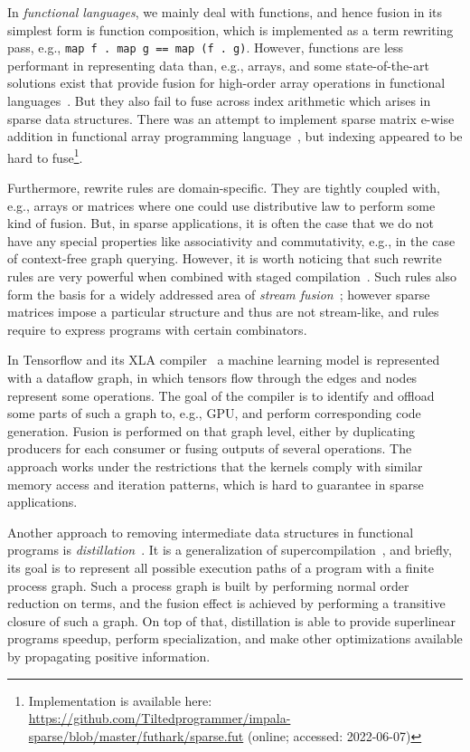 In \textit{functional languages}, we mainly deal with functions, and hence fusion in its simplest form is function composition, which is implemented as a term rewriting pass, e.g., \texttt{map f . map g == map (f . g)}. However, functions are less performant in representing data than, e.g., arrays, and some state-of-the-art solutions exist that provide fusion for high-order array operations in functional languages~\cite{Futhark}. But they also fail to fuse across index arithmetic which arises in sparse data structures. There was an attempt to implement sparse matrix e-wise addition in functional array programming language~\cite{Futhark}, but indexing appeared to be hard to fuse\footnote{Implementation is available here: \url{https://github.com/Tiltedprogrammer/impala-sparse/blob/master/futhark/sparse.fut} (online; accessed: 2022-06-07)}. 

Furthermore, rewrite rules are domain-specific. They are tightly coupled with, e.g., arrays or matrices where one could use distributive law to perform some kind of fusion. But, in sparse applications, it is often the case that we do not have any special properties like associativity and commutativity, e.g., in the case of context-free graph querying. However, it is worth noticing that such rewrite rules are very powerful when combined with staged compilation~\cite{stagedLinAlg}. Such rules also form the basis for a widely addressed area of \textit{stream fusion}~\cite{StreamFus}; however sparse matrices impose a particular structure and thus are not stream-like, and rules require to express programs with certain combinators.

In Tensorflow and its XLA compiler~\cite{TensorFlowXLA} a machine learning model is represented with a dataflow graph, in which tensors flow through the edges and nodes represent some operations. The goal of the compiler is to identify and offload some parts of such a graph to, e.g., GPU, and perform corresponding code generation. Fusion is performed on that graph level, either by duplicating producers for each consumer or fusing outputs of several operations. The approach works under the restrictions that the kernels comply with similar memory access and iteration patterns, which is hard to guarantee in sparse applications.  

Another approach to removing intermediate data structures in functional programs is \textit{distillation}~\cite{distillation}. It is a generalization of supercompilation~\cite{supercompilation}, and briefly, its goal is to represent all possible execution paths of a program with a finite process graph. Such a process graph is built by performing normal order reduction on terms, and the fusion effect is achieved by performing a transitive closure of such a graph. On top of that, distillation is able to provide superlinear programs speedup, perform specialization, and make other optimizations available by propagating positive information.


